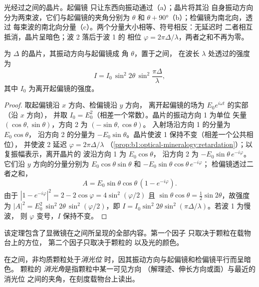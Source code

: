 \begin{omfigure}
{\small 光经过之间的晶片。起偏镜
只让东西向振动通过（a）；晶片将其沿
自身振动方向分为两束波，它们与起偏镜的夹角分别为
$\theta$ 和 $\theta + \ang{90}$（b）；检偏镜为南北向，透过
每束波的南北向分量（c）。两个分量大小相等、符号相反：无延迟时
二者相互抵消，晶片呈暗色；波 2 落后于波 1 的
相位 $\varphi = 2\pi\Delta/\lambda$，两者之和不再为零。}
\end{omfigure}

\begin{theorem}[正交偏光之间的强度]\label{thm:b1:optical-mineralogy:intensity}
为 $\Delta$ 的晶片，其振动方向与起偏镜成
角 $\theta$，置于之间，
在波长 $\lambda$ 处透过的强度为
\[
  I = I_0\,\sin^2 2\theta\,\sin^2\frac{\pi\Delta}{\lambda},
\]
其中 $I_0$ 为离开起偏镜的强度。
\end{theorem}

\begin{proof}
取起偏镜沿 $x$ 方向、检偏镜沿 $y$ 方向，
离开起偏镜的场为 $E_0 e^{i\omega t}$ 的实部（沿 $x$ 方向），
并取 $I_0 = E_0^2$（相差一个常数）。晶片的振动方向 1 为单位
矢量 $(\cos\theta, \sin\theta)$，方向 2 为 $(-\sin\theta, \cos\theta)$。
入射场沿方向 1 的分量为 $E_0\cos\theta$，
沿方向 2 的分量为 $-E_0\sin\theta$。晶片使波 1 保持不变（相差一个公共相位），
并使波 2 延迟 $\varphi = 2\pi\Delta/\lambda$
（\cref{prop:b1:optical-mineralogy:retardation}）；以复振幅表示，离开晶片的
波沿方向 1 为 $E_0\cos\theta$，
沿方向 2 为 $-E_0\sin\theta\,e^{-i\varphi}$。它们沿 $y$ 方向的分量分别为
$E_0\cos\theta\sin\theta$ 和 $-E_0\sin\theta\cos\theta\,e^{-i\varphi}$；
检偏镜透过二者之和，
\[
  A = E_0\sin\theta\cos\theta\,(1 - e^{-i\varphi}) .
\]
由于 $|1 - e^{-i\varphi}|^2 = 2 - 2\cos\varphi = 4\sin^2(\varphi/2)$ 且
$\sin\theta\cos\theta = \frac12\sin2\theta$，故强度为
$|A|^2 = E_0^2\,\sin^2 2\theta\,\sin^2(\varphi/2)$，即
$I = I_0\sin^2 2\theta\sin^2(\pi\Delta/\lambda)$。若波 1 为慢波，
则 $\varphi$ 变号，$I$ 保持不变。
\end{proof}

该定理包含了显微镜在之间所呈现的全部内容。第一个因子
只取决于颗粒在载物台上的方位，
第二个因子只取决于颗粒的
以及光的颜色。

\begin{definition}\label{def:b1:optical-mineralogy:extinction}
在之间，非均质颗粒处于\emph{消光位}
时，因其振动方向与起偏镜和检偏镜平行而呈暗色。
颗粒的
\emph{消光角}是指颗粒中某一可见方向
（解理迹、伸长方向或面）与最近的消光位
之间的夹角，在刻度载物台上读出。
\end{definition}

